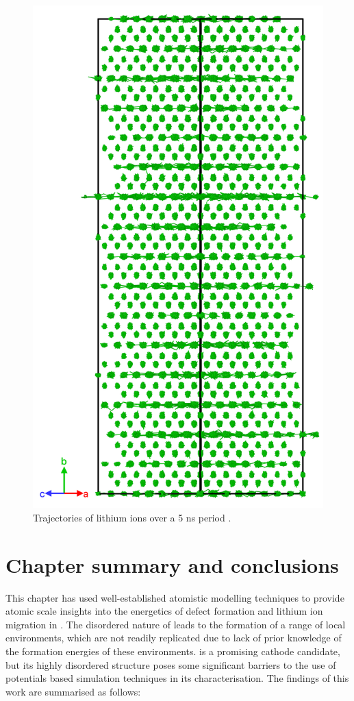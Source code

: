 \begin{figure}[p]
\centering
\includegraphics[height=0.8\textheight]{figures/static/trace_portrait}
\caption{Trajectories of lithium ions over a 5 ns period .}
\label{fig:trajectory}
\end{figure}


\newpage
\section{Chapter summary and conclusions}
This chapter has used well-established atomistic modelling techniques to provide atomic scale insights into the energetics of defect formation and lithium ion migration in .
The disordered nature of  leads to the formation of a range of local environments, which are not readily replicated due to lack of prior knowledge of the formation energies of these environments.
 is a promising cathode candidate, but its highly disordered structure poses some significant barriers to the use of potentials based simulation techniques in its characterisation.
The findings of this work are summarised as follows:

